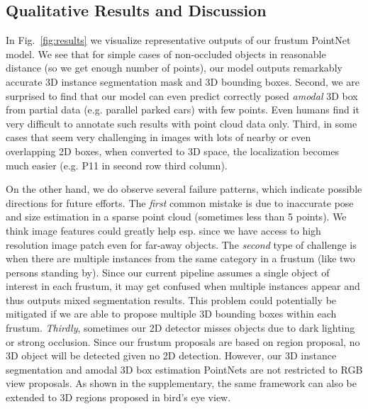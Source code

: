 \documentclass[10pt,twocolumn,letterpaper]{article}
\begin{document}
\vspace{-.16in}
\subsection{Qualitative Results and Discussion}
\label{sec:exp_viz}
In Fig.~\ref{fig:results} we visualize representative outputs of our frustum PointNet model. We see that for simple cases of non-occluded objects in reasonable distance (so we get enough number of points), our model outputs remarkably accurate 3D instance segmentation mask and 3D bounding boxes. Second, we are surprised to find that our model can even predict correctly posed \emph{amodal} 3D box from partial data (e.g. parallel parked cars) with few points. Even humans find it very difficult to annotate such results with point cloud data only. Third, in some cases that seem very challenging in images with lots of nearby or even overlapping 2D boxes, when converted to 3D space, the localization becomes much easier (e.g. P11 in second row third column).

On the other hand, we do observe several failure patterns, which indicate possible directions for future efforts.
The \emph{first} common mistake is due to inaccurate pose and size estimation in a sparse point cloud (sometimes less than 5 points). We think image features could greatly help esp. since we have access to high resolution image patch even for far-away objects.
The \emph{second} type of challenge is when there are multiple instances from the same category in a frustum (like two persons standing by). Since our current pipeline assumes a single object of interest in each frustum, it may get confused when multiple instances appear and thus outputs mixed segmentation results. This problem could potentially be mitigated if we are able to propose multiple 3D bounding boxes within each frustum.
\emph{Thirdly}, sometimes our 2D detector misses objects due to dark lighting or strong occlusion.  Since our frustum proposals are based on region proposal, no 3D object will be detected given no 2D detection. However, our 3D instance segmentation and amodal 3D box estimation PointNets are not restricted to RGB view proposals. As shown in the supplementary, the same framework can also be extended to 3D regions proposed in bird's eye view.







%
 
\vspace{-.11in}
\end{document}

